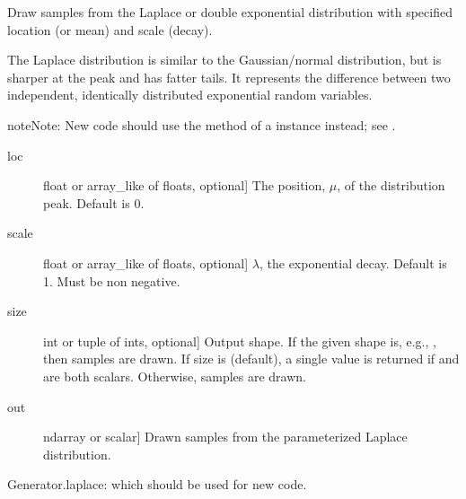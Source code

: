 \documentclass[letterpaper,10pt,english]{sphinxmanual}
\begin{document}
\begin{fulllineitems}
\label{\detokenize{infrapy.utils:infrapy.utils.ref2sac.laplace}}
Draw samples from the Laplace or double exponential distribution with
specified location (or mean) and scale (decay).

The Laplace distribution is similar to the Gaussian/normal distribution,
but is sharper at the peak and has fatter tails. It represents the
difference between two independent, identically distributed exponential
random variables.

\begin{sphinxadmonition}{note}{Note:}
New code should use the  method of a 
instance instead; see .
\end{sphinxadmonition}
\begin{description}
\item[{loc}] \leavevmode{[}float or array\_like of floats, optional{]}
The position, \(\mu\), of the distribution peak. Default is 0.

\item[{scale}] \leavevmode{[}float or array\_like of floats, optional{]}
\(\lambda\), the exponential decay. Default is 1. Must be non\sphinxhyphen{}
negative.

\item[{size}] \leavevmode{[}int or tuple of ints, optional{]}
Output shape.  If the given shape is, e.g., , then
 samples are drawn.  If size is  (default),
a single value is returned if  and  are both scalars.
Otherwise,  samples are drawn.

\end{description}
\begin{description}
\item[{out}] \leavevmode{[}ndarray or scalar{]}
Drawn samples from the parameterized Laplace distribution.

\end{description}

Generator.laplace: which should be used for new code.


\end{fulllineitems}
\end{document}
